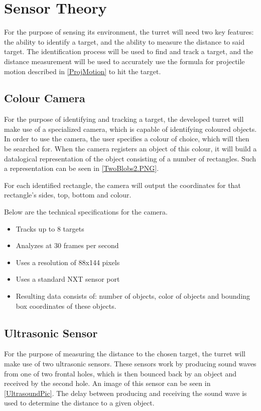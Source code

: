 \section{Sensor Theory}\label{SensorTheory}
For the purpose of sensing its environment, the turret will need two key
features: the ability to identify a target, and the ability to measure the
distance to said target. The identification process will be used to find and
track a target, and the distance measurement will be used to accurately use the
formula for projectile motion described in \autoref{ProjMotion} to hit the
target.

\subsection{Colour Camera}\label{SensTheoCam}
For the purpose of identifying and tracking a target, the developed turret will
make use of a specialized camera, which is capable of identifying coloured
objects. In order to use the camera, the user specifies a colour of choice,
which will then be searched for. When the camera registers an object of this
colour, it will build a datalogical representation of the object consisting of a
number of rectangles. Such a representation can be seen in
\autoref{TwoBlobs2.PNG}. 


For each identified rectangle, the camera will output the coordinates for that
rectangle's sides, top, bottom and colour. 

Below are the technical specifications \citep[p. 1]{NXTCam} for the camera.
\begin{itemize}
  \item Tracks up to 8 targets
  \item Analyzes at 30 frames per second
  \item Uses a resolution of 88x144 pixels
  \item Uses a standard NXT sensor port
  \item Resulting data consists of: number of objects, color of objects and
  bounding box coordinates of these objects.
\end{itemize}

\subsection{Ultrasonic Sensor}\label{SensTheoUltra}
For the purpose of measuring the distance to the chosen target, the turret will
make use of two ultrasonic sensors. These sensors work by producing sound waves
from one of two frontal holes, which is then bounced back by an object and
received by the second hole. An image of this sensor can be seen in
\autoref{UltrasoundPic}.
The delay between producing and receiving the sound wave is used to determine
the distance to a given object.

